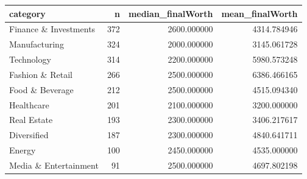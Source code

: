 \begin{tabular}{lrrr}
\toprule
category & n & median\_finalWorth & mean\_finalWorth \\
\midrule
Finance \& Investments & 372 & 2600.000000 & 4314.784946 \\
Manufacturing & 324 & 2000.000000 & 3145.061728 \\
Technology & 314 & 2200.000000 & 5980.573248 \\
Fashion \& Retail & 266 & 2500.000000 & 6386.466165 \\
Food \& Beverage & 212 & 2500.000000 & 4515.094340 \\
Healthcare & 201 & 2100.000000 & 3200.000000 \\
Real Estate & 193 & 2300.000000 & 3406.217617 \\
Diversified & 187 & 2300.000000 & 4840.641711 \\
Energy & 100 & 2450.000000 & 4535.000000 \\
Media \& Entertainment & 91 & 2500.000000 & 4697.802198 \\
\bottomrule
\end{tabular}
